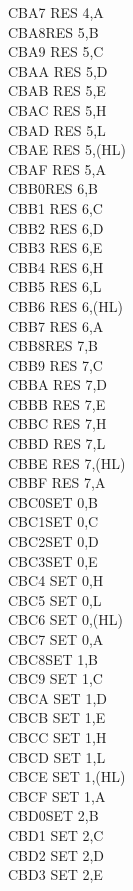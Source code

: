 \documentclass[12pt,twoside,openright,a4paper]{book}
\begin{document}
\begin{multicols}{3}
{\begin{tabbing}
	CBA7\> 	RES 4,A\\
	CBA8\>RES 5,B\\
	CBA9\> 	RES 5,C\\
	CBAA\> 	RES 5,D\\
	CBAB\> 	RES 5,E\\
	CBAC\> 	RES 5,H\\
	CBAD\> 	RES 5,L\\
	CBAE\> 	RES 5,(HL)\\
	CBAF\> 	RES 5,A\\
	CBB0\>RES 6,B\\
	CBB1\> 	RES 6,C\\
	CBB2\> 	RES 6,D\\
	CBB3\> 	RES 6,E\\
	CBB4\> 	RES 6,H\\
	CBB5\> 	RES 6,L\\
	CBB6\> 	RES 6,(HL)\\
	CBB7\> 	RES 6,A\\
	CBB8\>RES 7,B\\
	CBB9\> 	RES 7,C\\
	CBBA\> 	RES 7,D\\
	CBBB\> 	RES 7,E\\
	CBBC\> 	RES 7,H\\
	CBBD\> 	RES 7,L\\
	CBBE\> 	RES 7,(HL)\\
	CBBF\> 	RES 7,A\\
	CBC0\>SET 0,B\\
	CBC1\>SET 0,C\\
	CBC2\>SET 0,D\\
	CBC3\>SET 0,E\\
	CBC4\> 	SET 0,H\\
	CBC5\> 	SET 0,L\\
	CBC6\> 	SET 0,(HL)\\
	CBC7\> 	SET 0,A\\
	CBC8\>SET 1,B\\
	CBC9\> 	SET 1,C\\
	CBCA\> 	SET 1,D\\
	CBCB\> 	SET 1,E\\
	CBCC\> 	SET 1,H\\
	CBCD\> 	SET 1,L\\
	CBCE\> 	SET 1,(HL)\\
	CBCF\> 	SET 1,A\\
	CBD0\>SET 2,B\\
	CBD1\> 	SET 2,C\\
	CBD2\> 	SET 2,D\\
	CBD3\> 	SET 2,E\\

\end{tabbing}}
\end{multicols}
\end{document}
